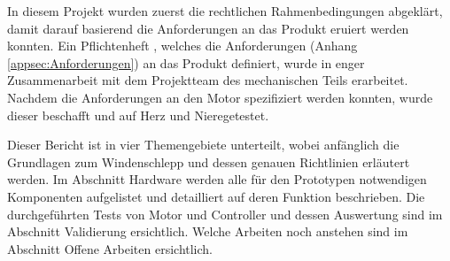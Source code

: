 In diesem Projekt wurden zuerst die rechtlichen Rahmenbedingungen abgeklärt, damit darauf basierend die Anforderungen an das Produkt eruiert werden konnten. Ein Pflichtenheft \cite{TechPflichtenheft}, welches die Anforderungen (Anhang \ref{appsec:Anforderungen}) an das Produkt definiert, wurde in enger Zusammenarbeit mit dem Projektteam des mechanischen Teils erarbeitet. Nachdem die Anforderungen an den Motor spezifiziert werden konnten, wurde dieser beschafft und auf \glqq Herz und Niere\grqq\space getestet.

Dieser Bericht ist in vier Themengebiete unterteilt, wobei anfänglich die Grundlagen zum Windenschlepp und dessen genauen Richtlinien erläutert werden. Im Abschnitt Hardware werden alle für den Prototypen notwendigen Komponenten aufgelistet und detailliert auf deren Funktion beschrieben. Die durchgeführten Tests von Motor und Controller und dessen Auswertung sind im Abschnitt Validierung ersichtlich. Welche Arbeiten noch anstehen sind im Abschnitt Offene Arbeiten ersichtlich.   


